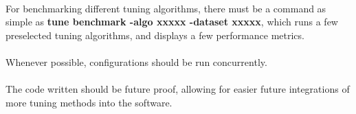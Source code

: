 \paragraph{}For benchmarking different tuning algorithms, there must be a command as simple as \textbf{tune benchmark -algo xxxxx -dataset xxxxx}, which runs a few preselected tuning algorithms, and displays a few performance metrics.

\paragraph{}Whenever possible, configurations should be run concurrently.

\paragraph{}The code written should be future proof, allowing for easier future integrations of more tuning methods into the software.



